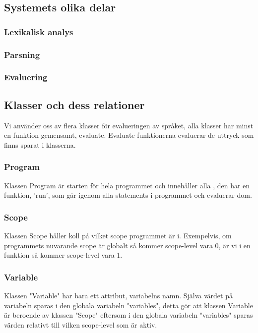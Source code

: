 \documentclass{TDP003mall}
\begin{document}
\subsection{Systemets olika delar}
\subsubsection{Lexikalisk analys}
\subsubsection{Parsning}
\subsubsection{Evaluering}

\subsection{Klasser och dess relationer}
Vi använder oss av flera klasser för evalueringen av språket, alla klasser har minst en funktion gemensamt, evaluate. Evaluate funktionerna evaluerar de uttryck som finns sparat i klasserna.

\subsubsection{Program}
Klassen Program är starten för hela programmet och innehåller alla , den har en funktion, 'run', som går igenom alla statements i programmet och evaluerar dom.

\subsubsection{Scope}
Klassen Scope håller koll på vilket scope programmet är i. Exempelvis, om programmets nuvarande scope är globalt så kommer scope-level vara 0, är vi i en funktion så kommer scope-level vara 1.

\subsubsection{Variable}
Klassen "Variable" har bara ett attribut, variabelns namn. Själva värdet på variabeln sparas i den globala variabeln "variables", detta gör att klassen Variable är beroende av klassen "Scope" eftersom i den globala variabeln "variables" sparas värden relativt till vilken scope-level som är aktiv.
\end{document}
